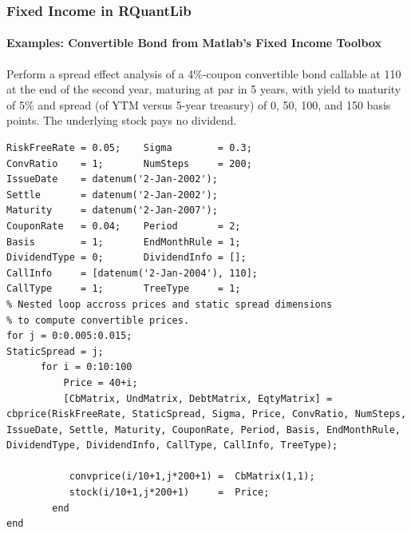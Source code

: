 \documentclass[smaller,compress, 9pt]{beamer}
\begin{document}
\begin{frame}[fragile]
	\frametitle{Fixed Income in RQuantLib}
	\framesubtitle{Examples: Convertible Bond from Matlab's Fixed Income Toolbox}	
Perform a spread effect analysis of a 4\%-coupon convertible bond callable at 110 at the end of the second year, maturing at par in 5 years, with yield to maturity of 5\% and spread (of YTM versus 5-year treasury) of 0, 50, 100, and 150 basis points. The underlying stock pays no dividend. 
\lstset{language=Matlab,basicstyle=\tiny}
	\begin{lstlisting}
RiskFreeRate = 0.05;	Sigma        = 0.3;
ConvRatio    = 1;   	NumSteps     = 200;
IssueDate    = datenum('2-Jan-2002');
Settle       = datenum('2-Jan-2002');
Maturity     = datenum('2-Jan-2007');
CouponRate   = 0.04;    Period       = 2;
Basis        = 1;		EndMonthRule = 1;
DividendType = 0;		DividendInfo = [];
CallInfo     = [datenum('2-Jan-2004'), 110]; 
CallType     = 1;		TreeType     = 1;   
% Nested loop accross prices and static spread dimensions
% to compute convertible prices.
for j = 0:0.005:0.015;
StaticSpread = j;
      for i = 0:10:100
          Price = 40+i;
          [CbMatrix, UndMatrix, DebtMatrix, EqtyMatrix] =  cbprice(RiskFreeRate, StaticSpread, Sigma, Price, ConvRatio, NumSteps, IssueDate, Settle, Maturity, CouponRate, Period, Basis, EndMonthRule, DividendType, DividendInfo, CallType, CallInfo, TreeType);
   
           convprice(i/10+1,j*200+1) =  CbMatrix(1,1);
           stock(i/10+1,j*200+1)     =  Price;
        end    
end
\end{lstlisting}
\end{frame}
\end{document}
